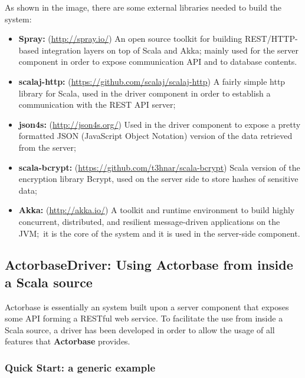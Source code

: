\documentclass{scalatekids-article}
\begin{document}
As shown in the image, there are some external libraries needed to build the system:
\begin{itemize}
\item \textbf{Spray:} (\url{http://spray.io/}) An open source toolkit for building REST/HTTP-based
  integration layers on top of Scala and Akka; mainly used for the server
  component in order to expose communication API and to
   database contents.
\item \textbf{scalaj-http:} (\url{https://github.com/scalaj/scalaj-http}) A fairly simple http library for Scala, used in the
  driver component in order to establish a communication with the REST API server;\
\item \textbf{json4s:} (\url{http://json4s.org/}) Used in the driver component to expose a pretty formatted
  JSON (JavaScript Object Notation) version of the data retrieved from the server;
\item \textbf{scala-bcrypt:} (\url{https://github.com/t3hnar/scala-bcrypt}) Scala version of the encryption library Bcrypt,
  used on the server side to store hashes of sensitive data;
\item \textbf{Akka:} (\url{http://akka.io/}) A toolkit and runtime environment to build highly concurrent,
  distributed, and resilient message-driven applications on the JVM;\ it is the core of
  the system and it is used in the server-side component.
\end{itemize}


\subsection{ActorbaseDriver: Using Actorbase from inside a Scala source}

Actorbase is essentially an  system built upon a server component
that exposes some API forming a RESTful web service. To facilitate the use from
inside a Scala source, a driver has been developed in order to allow the
usage of all features that \textbf{Actorbase} provides.\\

\subsubsection{Quick Start: a generic example}
\end{document}
